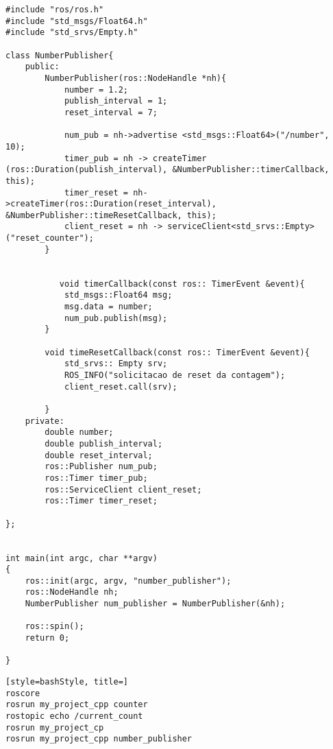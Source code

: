 \documentclass[letterpaper]{article}
\begin{document}
\begin{lstlisting}[style=cppStyle, title=number\_publisher.cpp] 
#include "ros/ros.h"
#include "std_msgs/Float64.h"
#include "std_srvs/Empty.h"

class NumberPublisher{
    public:
        NumberPublisher(ros::NodeHandle *nh){
            number = 1.2;
            publish_interval = 1;
            reset_interval = 7;

            num_pub = nh->advertise <std_msgs::Float64>("/number", 10);
            timer_pub = nh -> createTimer (ros::Duration(publish_interval), &NumberPublisher::timerCallback, this);
            timer_reset = nh->createTimer(ros::Duration(reset_interval), &NumberPublisher::timeResetCallback, this);
            client_reset = nh -> serviceClient<std_srvs::Empty>("reset_counter");
        }


           void timerCallback(const ros:: TimerEvent &event){
            std_msgs::Float64 msg;
            msg.data = number;
            num_pub.publish(msg);
        }

        void timeResetCallback(const ros:: TimerEvent &event){
            std_srvs:: Empty srv;
            ROS_INFO("solicitacao de reset da contagem");
            client_reset.call(srv);

        }
    private:
        double number;
        double publish_interval;
        double reset_interval;
        ros::Publisher num_pub;
        ros::Timer timer_pub;
        ros::ServiceClient client_reset;    
        ros::Timer timer_reset;

};


int main(int argc, char **argv)
{
    ros::init(argc, argv, "number_publisher");
    ros::NodeHandle nh;
    NumberPublisher num_publisher = NumberPublisher(&nh);

    ros::spin();
    return 0;

}
\end{lstlisting}

\begin{lstlisting}[style=bashStyle, title=] 
roscore
rosrun my_project_cpp counter
rostopic echo /current_count
rosrun my_project_cp
rosrun my_project_cpp number_publisher
\end{lstlisting}
\end{document}
